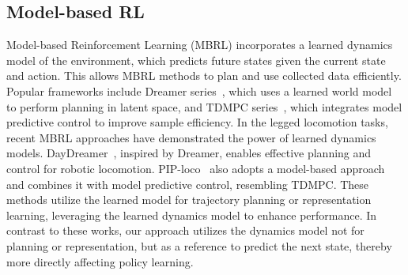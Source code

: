 \subsection{Model-based RL}
Model-based Reinforcement Learning (MBRL) incorporates a learned dynamics model of the environment, which predicts future states given the current state and action. This allows MBRL methods to plan and use collected data efficiently. Popular frameworks include Dreamer series~\cite{hafner2019dream, hafner2020mastering, hafner2023mastering}, which uses a learned world model to perform planning in latent space, and TDMPC series~\cite{hansen2022temporal, hansen2023td}, which integrates model predictive control to improve sample efficiency.
In the legged locomotion tasks, recent MBRL approaches have demonstrated the power of learned dynamics models. DayDreamer~\cite{wu2023daydreamer}, inspired by Dreamer, enables effective planning and control for robotic locomotion. PIP-loco~\cite{shirwatkar2024pip} also adopts a model-based approach and combines it with model predictive control, resembling TDMPC. These methods utilize the learned model for trajectory planning or representation learning, leveraging the learned dynamics model to enhance performance.
In contrast to these works, our approach utilizes the dynamics model not for planning or representation, but as a reference to predict the next state, thereby more directly affecting policy learning.